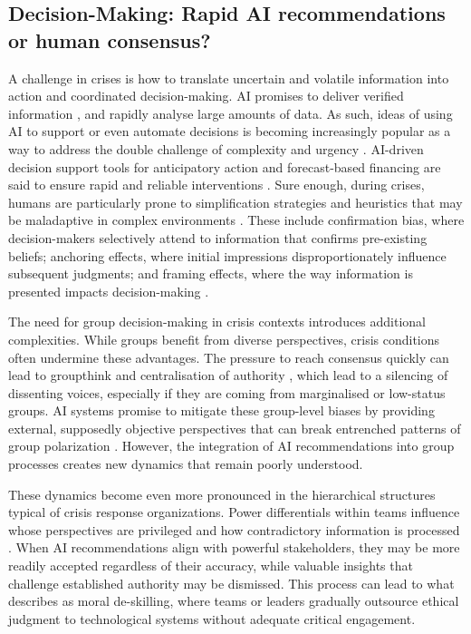 \documentclass[pdflatex,sn-apa]{sn-jnl}%
\begin{document}
\subsection{Decision-Making: Rapid AI recommendations or human consensus?}
A challenge in crises is how to translate uncertain and volatile information into action and coordinated decision-making. AI promises to deliver verified information \citep{zhao2025tailoring}, and rapidly analyse large amounts of data. As such, ideas of using AI to support or even automate decisions is becoming increasingly popular as a way to address the double challenge of complexity and urgency \citep{comes2024ai}. AI-driven decision support tools for anticipatory action and forecast-based financing are said to ensure rapid and reliable interventions \citep{thalheimer2022role}. Sure enough, during crises, humans are particularly prone to simplification strategies and heuristics that may be maladaptive in complex environments \citep{klein2010rapid}. These include confirmation bias, where decision-makers selectively attend to information that confirms pre-existing beliefs; anchoring effects, where initial impressions disproportionately influence subsequent judgments; and framing effects, where the way information is presented impacts decision-making \citep{paulus2022influence}.

The need for group decision-making in crisis contexts introduces additional complexities. While groups benefit from diverse perspectives, crisis conditions often undermine these advantages. The pressure to reach consensus quickly can lead to groupthink and centralisation of authority \citep{driskell1991group}, which lead to a silencing of dissenting voices, especially if they are coming from marginalised or low-status groups. AI systems promise to mitigate these group-level biases by providing external, supposedly objective perspectives that can break entrenched patterns of group polarization \citep{jirovsky2021can}. However, the integration of AI recommendations into group processes creates new dynamics that remain poorly understood.


These dynamics become even more pronounced in the hierarchical structures typical of crisis response organizations. Power differentials within teams influence whose perspectives are privileged and how contradictory information is processed \citep{comes2024ai}. When AI recommendations align with powerful stakeholders, they may be more readily accepted regardless of their accuracy, while valuable insights that challenge established authority may be dismissed. This process can lead to what \citet{vallor2015moral} describes as moral de-skilling, where teams or leaders gradually outsource ethical judgment to technological systems without adequate critical engagement.
\end{document}
